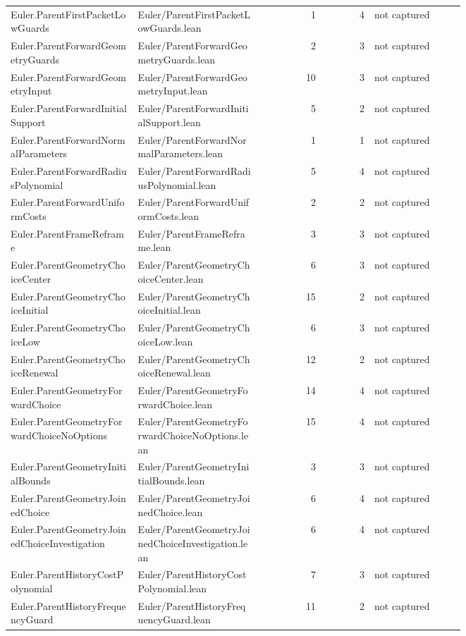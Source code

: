 \documentclass[10pt]{article}
\begin{document}
\begin{longtable}{p{0.28\linewidth}p{0.27\linewidth}r r p{0.20\linewidth}}
Euler.ParentFirstPacketLowGuards & Euler/ParentFirstPacketLowGuards.lean & 1 & 4 & not captured\\
Euler.ParentForwardGeometryGuards & Euler/ParentForwardGeometryGuards.lean & 2 & 3 & not captured\\
Euler.ParentForwardGeometryInput & Euler/ParentForwardGeometryInput.lean & 10 & 3 & not captured\\
Euler.ParentForwardInitialSupport & Euler/ParentForwardInitialSupport.lean & 5 & 2 & not captured\\
Euler.ParentForwardNormalParameters & Euler/ParentForwardNormalParameters.lean & 1 & 1 & not captured\\
Euler.ParentForwardRadiusPolynomial & Euler/ParentForwardRadiusPolynomial.lean & 5 & 4 & not captured\\
Euler.ParentForwardUniformCosts & Euler/ParentForwardUniformCosts.lean & 2 & 2 & not captured\\
Euler.ParentFrameReframe & Euler/ParentFrameReframe.lean & 3 & 3 & not captured\\
Euler.ParentGeometryChoiceCenter & Euler/ParentGeometryChoiceCenter.lean & 6 & 3 & not captured\\
Euler.ParentGeometryChoiceInitial & Euler/ParentGeometryChoiceInitial.lean & 15 & 2 & not captured\\
Euler.ParentGeometryChoiceLow & Euler/ParentGeometryChoiceLow.lean & 6 & 3 & not captured\\
Euler.ParentGeometryChoiceRenewal & Euler/ParentGeometryChoiceRenewal.lean & 12 & 2 & not captured\\
Euler.ParentGeometryForwardChoice & Euler/ParentGeometryForwardChoice.lean & 14 & 4 & not captured\\
Euler.ParentGeometryForwardChoiceNoOptions & Euler/ParentGeometryForwardChoiceNoOptions.lean & 15 & 4 & not captured\\
Euler.ParentGeometryInitialBounds & Euler/ParentGeometryInitialBounds.lean & 3 & 3 & not captured\\
Euler.ParentGeometryJoinedChoice & Euler/ParentGeometryJoinedChoice.lean & 6 & 4 & not captured\\
Euler.ParentGeometryJoinedChoiceInvestigation & Euler/ParentGeometryJoinedChoiceInvestigation.lean & 6 & 4 & not captured\\
Euler.ParentHistoryCostPolynomial & Euler/ParentHistoryCostPolynomial.lean & 7 & 3 & not captured\\
Euler.ParentHistoryFrequencyGuard & Euler/ParentHistoryFrequencyGuard.lean & 11 & 2 & not captured\\

\end{longtable}
\end{document}
